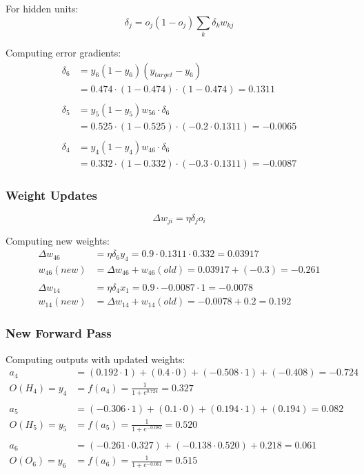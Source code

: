 \documentclass{exam}
\begin{document}
For hidden units:
\begin{equation}
\delta_j = o_j(1 - o_j)\sum_k \delta_k w_{kj}
\end{equation}

Computing error gradients:
\begin{align*}
\delta_6 &= y_6(1 - y_6)(y_{target} - y_6) \\
&= 0.474 \cdot (1 - 0.474) \cdot (1 - 0.474) = 0.1311 \\
\\
\delta_5 &= y_5(1 - y_5)w_{56} \cdot \delta_6 \\
&= 0.525 \cdot (1 - 0.525) \cdot (-0.2 \cdot 0.1311) = -0.0065 \\
\\
\delta_4 &= y_4(1 - y_4)w_{46} \cdot \delta_6 \\
&= 0.332 \cdot (1 - 0.332) \cdot (-0.3 \cdot 0.1311) = -0.0087
\end{align*}

\subsubsection*{Weight Updates}
\begin{equation}
\Delta w_{ji} = \eta\delta_j o_i
\end{equation}

Computing new weights:
\begin{align*}
\Delta w_{46} &= \eta\delta_6 y_4 = 0.9 \cdot 0.1311 \cdot 0.332 = 0.03917 \\
w_{46}(new) &= \Delta w_{46} + w_{46}(old) = 0.03917 + (-0.3) = -0.261 \\
\\
\Delta w_{14} &= \eta\delta_4 x_1 = 0.9 \cdot -0.0087 \cdot 1 = -0.0078 \\
w_{14}(new) &= \Delta w_{14} + w_{14}(old) = -0.0078 + 0.2 = 0.192
\end{align*}

\subsubsection*{New Forward Pass}
Computing outputs with updated weights:
\begin{align*}
a_4 &= (0.192 \cdot 1) + (0.4 \cdot 0) + (-0.508 \cdot 1) + (-0.408) = -0.724 \\
O(H_4) = y_4 &= f(a_4) = \frac{1}{1 + e^{0.724}} = 0.327 \\
\\
a_5 &= (-0.306 \cdot 1) + (0.1 \cdot 0) + (0.194 \cdot 1) + (0.194) = 0.082 \\
O(H_5) = y_5 &= f(a_5) = \frac{1}{1 + e^{-0.082}} = 0.520 \\
\\
a_6 &= (-0.261 \cdot 0.327) + (-0.138 \cdot 0.520) + 0.218 = 0.061 \\
O(O_6) = y_6 &= f(a_6) = \frac{1}{1 + e^{-0.061}} = 0.515
\end{align*}
\end{document}
